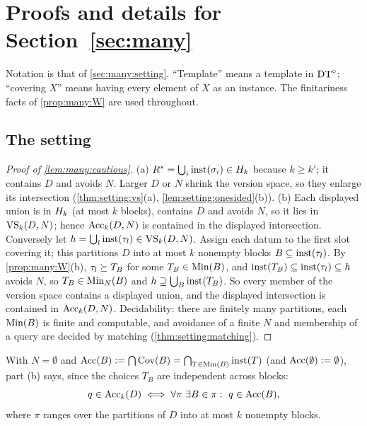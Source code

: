 \section{Proofs and details for Section~\ref{sec:many}}\label{app:many}

Notation is that of \cref{sec:many:setting}. ``Template'' means a template in $\mathrm{DT}^{\circ}$; ``covering $X$'' means having every
element of $X$ as an instance. The finitariness facts of \cref{prop:many:W} are used throughout.

\subsection{The setting}\label{app:many:setting}

\begin{proof}[Proof of \cref{lem:many:cautious}]
(a) $R^{*}=\bigcup_i\mathrm{inst}(\sigma_i)\in H_{k}$ because $k\ge k'$; it contains $D$ and avoids $N$. Larger $D$ or $N$
shrink the version space, so they enlarge its intersection (\cref{thm:setting:vs}(a), \cref{lem:setting:onesided}(b)).
(b) Each displayed union is in $H_{k}$ (at most $k$ blocks), contains $D$ and avoids $N$, so it lies in
$\mathrm{VS}_k(D,N)$; hence $\mathrm{Acc}_k(D,N)$ is contained in the displayed intersection. Conversely let
$h=\bigcup_l\mathrm{inst}(\tau_l)\in\mathrm{VS}_k(D,N)$. Assign each datum to the first slot covering it; this partitions $D$ into at
most $k$ nonempty blocks $B\subseteq\mathrm{inst}(\tau_l)$. By \cref{prop:many:W}(b), $\tau_l\succeq T_B$ for some $T_B\in\mathrm{Min}(B)$, and
$\mathrm{inst}(T_B)\subseteq\mathrm{inst}(\tau_l)\subseteq h$ avoids $N$, so $T_B\in\mathrm{Min}_N(B)$ and $h\supseteq\bigcup_B\mathrm{inst}(T_B)$. So every
member of the version space contains a displayed union, and the displayed intersection is contained in $\mathrm{Acc}_k(D,N)$.
Decidability: there are finitely many partitions, each $\mathrm{Min}(B)$ is finite and computable, and avoidance of a finite $N$
and membership of a query are decided by matching (\cref{thm:setting:matching}).
\end{proof}

With $N=\emptyset$ and $\mathrm{Acc}(B):=\bigcap\mathrm{Cov}(B)=\bigcap_{T\in\mathrm{Min}(B)}\mathrm{inst}(T)$ (and $\mathrm{Acc}(\emptyset):=\emptyset$), part (b)
says, since the choices $T_B$ are independent across blocks:
\begin{equation}\label{eq:many:partition}
q\in\mathrm{Acc}_k(D)\iff\forall\pi\ \exists B\in\pi:\ q\in\mathrm{Acc}(B),
\end{equation}
where $\pi$ ranges over the partitions of $D$ into at most $k$ nonempty blocks.

